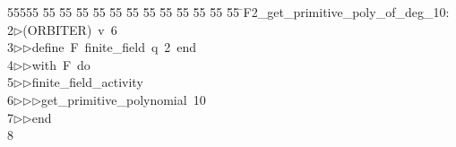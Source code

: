 %
%
\begin{tabbing}
55555 \= 55 \= 55 \= 55 \= 55 \= 55 \= 55 \= 55 \= 55 \= 55 \= 55 \= 55 \= 55 \= \>F2\_get\_primitive\_poly\_of\_deg\_10:\\[0pt]
2\>$\triangleright$\>(ORBITER)\ v\ 6\ \\[0pt]
3\>$\triangleright$\>$\triangleright$\>define\ F\ finite\_field\ q\ 2\ end\ \\[0pt]
4\>$\triangleright$\>$\triangleright$\>with\ F\ do\ \\[0pt]
5\>$\triangleright$\>$\triangleright$\>finite\_field\_activity\ \\[0pt]
6\>$\triangleright$\>$\triangleright$\>$\triangleright$\>get\_primitive\_polynomial\ 10\ \\[0pt]
7\>$\triangleright$\>$\triangleright$\>end\\[0pt]
8\>\end{tabbing}
